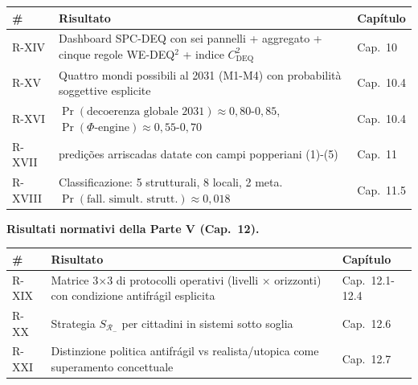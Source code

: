 {\def\LTcaptype{none} %
{\small\begin{longtable}[]{@{}
  >{\raggedright\arraybackslash}p{}
  >{\raggedright\arraybackslash}p{}
  >{\raggedright\arraybackslash}p{}@{}}
\toprule\noalign{}
\begin{minipage}[b]{\linewidth}\raggedright
\#
\end{minipage} & \begin{minipage}[b]{\linewidth}\raggedright
Risultato
\end{minipage} & \begin{minipage}[b]{\linewidth}\raggedright
Capítulo
\end{minipage} \\
\midrule\noalign{}
\endhead
\bottomrule\noalign{}
\endlastfoot
R-XIV & Dashboard SPC-DEQ con sei pannelli + aggregato + cinque regole
WE-DEQ$^2$ + indice \(C_{\text{DEQ}}^2\) & Cap.~10 \\
R-XV & Quattro mondi possibili al 2031 (M1-M4) con probabilità
soggettive esplicite & Cap.~10.4 \\
R-XVI &
\(\Pr(\text{decoerenza globale 2031}) \approx 0{,}80\)-\(0{,}85\),
\(\Pr(\Phi\text{-engine}) \approx 0{,}55\)-\(0{,}70\) & Cap.~10.4 \\
R-XVII & 16 predições arriscadas datate con campi popperiani (1)-(5) &
Cap.~11 \\
R-XVIII & Classificazione: 5 strutturali, 8 locali, 2 meta.
\(\Pr(\text{fall. simult. strutt.}) \approx 0{,}018\) & Cap.~11.5 \\
\end{longtable}}
}

\Proved{} \textbf{Risultati normativi della Parte V (Cap.~12).}

{\def\LTcaptype{none} %
{\small\begin{longtable}[]{@{}
  >{\raggedright\arraybackslash}p{}
  >{\raggedright\arraybackslash}p{}
  >{\raggedright\arraybackslash}p{}@{}}
\toprule\noalign{}
\begin{minipage}[b]{\linewidth}\raggedright
\#
\end{minipage} & \begin{minipage}[b]{\linewidth}\raggedright
Risultato
\end{minipage} & \begin{minipage}[b]{\linewidth}\raggedright
Capítulo
\end{minipage} \\
\midrule\noalign{}
\endhead
\bottomrule\noalign{}
\endlastfoot
R-XIX & Matrice 3$\times$3 di protocolli operativi (livelli $\times$ orizzonti) con
condizione antifrágil esplicita & Cap.~12.1-12.4 \\
R-XX & Strategia \(S_{\mathcal{R}_-}\) per cittadini in sistemi sotto
soglia & Cap.~12.6 \\
R-XXI & Distinzione politica antifrágil vs realista/utopica come
superamento concettuale & Cap.~12.7 \\
\end{longtable}}
}

